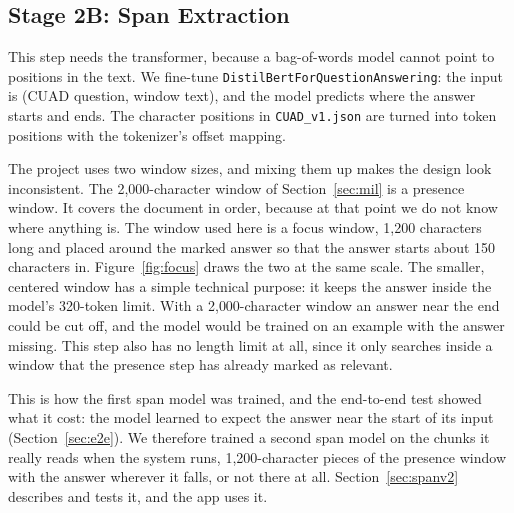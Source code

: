 \subsection{Stage 2B: Span Extraction}
\label{sec:spanmethod}
This step needs the transformer, because a bag-of-words model cannot point to positions in the text. We fine-tune \texttt{DistilBertForQuestionAnswering}: the input is (CUAD question, window text), and the model predicts where the answer starts and ends. The character positions in \texttt{CUAD\_v1.json} are turned into token positions with the tokenizer's offset mapping.

The project uses two window sizes, and mixing them up makes the design look inconsistent. The 2{,}000-character window of Section~\ref{sec:mil} is a presence window. It covers the document in order, because at that point we do not know where anything is. The window used here is a focus window, 1{,}200 characters long and placed around the marked answer so that the answer starts about 150 characters in. Figure~\ref{fig:focus} draws the two at the same scale. The smaller, centered window has a simple technical purpose: it keeps the answer inside the model's 320-token limit. With a 2{,}000-character window an answer near the end could be cut off, and the model would be trained on an example with the answer missing. This step also has no length limit at all, since it only searches inside a window that the presence step has already marked as relevant.

This is how the first span model was trained, and the end-to-end test showed what it cost: the model learned to expect the answer near the start of its input (Section~\ref{sec:e2e}). We therefore trained a second span model on the chunks it really reads when the system runs, 1{,}200-character pieces of the presence window with the answer wherever it falls, or not there at all. Section~\ref{sec:spanv2} describes and tests it, and the app uses it.

